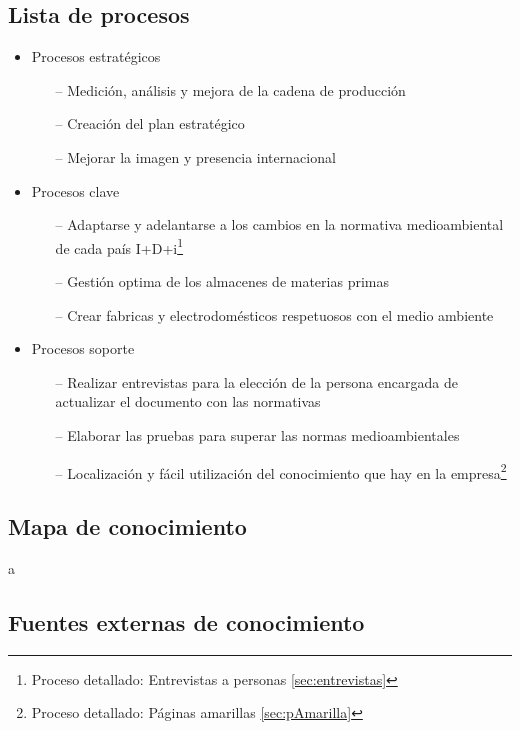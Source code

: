 \documentclass[twoside]{article}
\begin{document}
\subsection{Lista de procesos}

\begin{itemize}
	\item Procesos estratégicos
	\begin{itemize}
		\item[--] Medición, análisis y mejora de la cadena de producción
		\item[--] Creación del plan estratégico
		\item[--] Mejorar la imagen y presencia internacional
	\end{itemize}
	\item Procesos clave
	\begin{itemize}
		\item[--] Adaptarse y adelantarse a los cambios en la normativa medioambiental de cada país I+D+i\footnote{Proceso detallado: Entrevistas a personas \ref{sec:entrevistas}}
		\item[--] Gestión optima de los almacenes de materias primas
		\item[--] Crear fabricas y electrodomésticos respetuosos con el medio ambiente
	\end{itemize}
	\item Procesos soporte
	\begin{itemize}
		\item[--] Realizar entrevistas para la elección de la persona encargada de actualizar el documento con las normativas
		\item[--] Elaborar las pruebas para superar las normas medioambientales
		\item[--] Localización y fácil utilización del conocimiento que hay en la empresa\footnote{Proceso detallado: Páginas amarillas \ref{sec:pAmarilla}}
	\end{itemize}
\end{itemize}




\subsection{Mapa de conocimiento}

a

\subsection{Fuentes externas de conocimiento}
\end{document}
